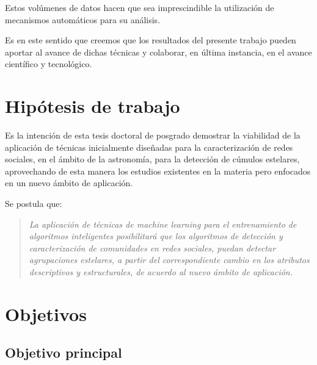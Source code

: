 \documentclass[
	11pt,oneside,a4paper,
	headsepline,footsepline,
	fleqn,
]{memoir}
\begin{document}
Estos volúmenes de datos hacen que sea imprescindible la utilización de mecanismos automáticos para su análisis. %

Es en este sentido que creemos que los resultados del presente trabajo pueden aportar al avance de dichas técnicas y colaborar, en última instancia, en el avance científico y tecnológico.



\section {Hipótesis de trabajo}

Es la intención de esta tesis doctoral de posgrado demostrar la viabilidad de la aplicación de técnicas inicialmente diseñadas para la caracterización de redes sociales, en el ámbito de la astronomía, para la detección de cúmulos estelares, aprovechando de esta manera los estudios existentes en la materia pero enfocados en un nuevo ámbito de aplicación.

Se postula que:

\begin{quote}
	\emph{
	La aplicación de técnicas de machine learning para el entrenamiento de algoritmos inteligentes posibilitará que los algoritmos de detección y caracterización de comunidades en redes sociales, puedan detectar agrupaciones estelares, a partir del correspondiente cambio en los atributos descriptivos y estructurales, de acuerdo al nuevo ámbito de aplicación.}
\end{quote}

\section {Objetivos}

\subsection{Objetivo principal} 
\end{document}
